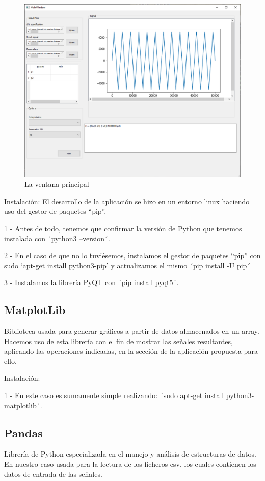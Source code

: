 \begin{figure}[htb]
\centering
  \includegraphics[width=1.0\linewidth]{images/gui} 
\caption{La ventana principal}
\label{fig:gui}
\end{figure}

Instalación: 
El desarrollo de la aplicación se hizo en un entorno linux haciendo uso del gestor de paquetes “pip”. 
 
1 - Antes de todo, tenemos que confirmar la versión de Python que tenemos instalada con ´python3 --version´.
 
2 - En el caso de que no lo tuviésemos, instalamos el gestor de paquetes “pip” con sudo ‘apt-get install python3-pip’ y actualizamos el mismo ´pip install -U pip´ 
 
3 - Instalamos la librería PyQT con ´pip install pyqt5´. 
 
\subsection{MatplotLib}
Biblioteca usada para generar gráficos a partir de datos almacenados en un array. Hacemos uso de esta librería con el fin de mostrar las señales resultantes, aplicando las operaciones indicadas, en la sección de la aplicación propuesta para ello. 
 
Instalación: 
 
1 - En este caso es sumamente simple realizando: ´sudo apt-get install python3-matplotlib´.
 
\subsection{Pandas}
Librería de Python especializada en el manejo y análisis de estructuras de datos. En nuestro caso usada para la lectura de los ficheros csv, los cuales contienen los datos de entrada de las señales.
 
